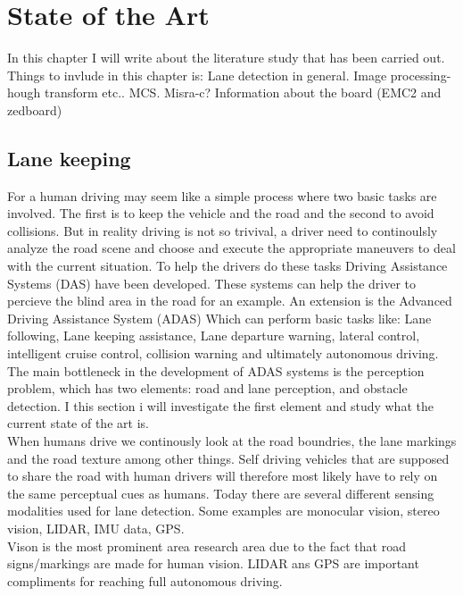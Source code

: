 \chapter{State of the Art}
In this chapter I will write about the literature study that has been carried out. Things to invlude in this chapter is: Lane detection in general. Image processing- hough transform etc.. MCS. Misra-c? Information about the board  (EMC2 and zedboard)

\section{Lane keeping}
For a human driving may seem like a simple process where two basic tasks are involved. The first is to keep the vehicle and the road and the second to avoid collisions. But in reality driving is not so trivival, a driver need to continoulsly analyze the road scene and choose and execute the appropriate maneuvers to deal with the current situation. To help the drivers do these tasks Driving Assistance Systems (DAS) have been developed. These systems can help the driver to percieve the blind area in the road for an example. An extension is the Advanced Driving Assistance System (ADAS) Which can perform basic tasks like: Lane following, Lane keeping assistance, Lane departure warning, lateral control, intelligent cruise control, collision warning and ultimately autonomous driving.\\

The main bottleneck in the development of ADAS systems is the perception problem, which has two elements: road and lane perception, and obstacle detection. I this section i will investigate the first element and study what the current state of the art is.\\

When humans drive we continously look at the road boundries, the lane markings and the road texture among other things. Self driving vehicles that are supposed to share the road with human drivers will therefore most likely have to rely on the same perceptual cues as humans. Today there are several different sensing modalities used for lane detection. Some examples are monocular vision, stereo vision, LIDAR, IMU data, GPS.\\

Vison is the most prominent area research area due to the fact that road signs/markings are made for human vision. LIDAR ans GPS are important compliments for reaching full autonomous driving.\\

